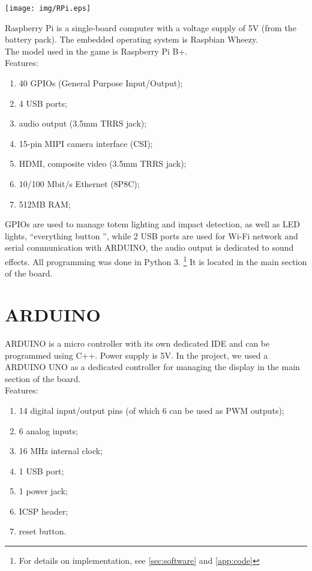 \documentclass[a4paper,twoside]{book}
\begin{document}
\begin{appendices}
    \texttt{[image: img/RPi.eps]}

Raspberry Pi is a single-board computer with a voltage supply of 5V (from the battery pack). The embedded operating system is Raspbian Wheezy. 
\\
The model used in the game is Raspberry Pi B+.
\\ 
Features:
\begin{enumerate}
\item 40 GPIOs (General Purpose Input/Output);
\item 4 USB ports;
\item audio output (3.5mm TRRS jack);
\item 15-pin MIPI camera interface (CSI);
\item HDMI, composite video (3.5mm TRRS jack);
\item 10/100 Mbit/s Ethernet (8P8C);
\item 512MB RAM;
\end{enumerate}
GPIOs are used to manage totem lighting and impact detection, as well as  LED lights, \textquotedblleft everything button \textquotedblright, while 2 USB ports are used for Wi-Fi network and serial communication with ARDUINO, the audio output is dedicated to sound effects. All programming was done in Python 3.
\footnote {For details on implementation, see \autoref{sec:software} and \autoref{app:code}}
It is located in the main section of the board.

\section{ARDUINO}
\label{app:Arduino}
ARDUINO is a micro controller with its own dedicated IDE and can be programmed using C++. Power supply is 5V. In the project, we used a ARDUINO UNO as a dedicated controller for managing the display in the main section of the board. 
\\
Features:
\begin{enumerate}
\item 14 digital input/output pins (of which 6 can be used as PWM outputs);
\item 6 analog inputs;
\item 16 MHz internal clock;
\item 1 USB port;
\item 1 power jack;
\item ICSP header;
\item reset button.
\end{enumerate} 


\end{appendices}
\end{document}

